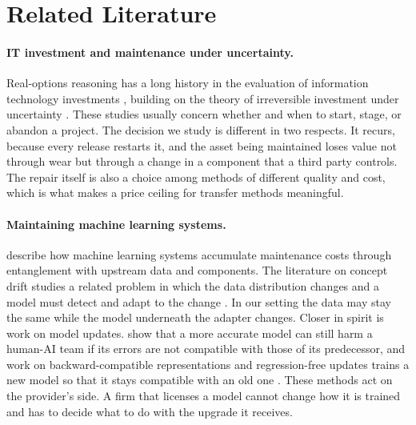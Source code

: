 \documentclass[ijds,blindrev]{informs4}
\begin{document}
\section{Related Literature}\label{sec:lit}

\paragraph{IT investment and maintenance under uncertainty.} Real-options reasoning has a long history in the evaluation of information technology investments \citep{benaroch1999case,benaroch2002managing}, building on the theory of irreversible investment under uncertainty \citep{mcdonald1986value,dixit1994investment}. These studies usually concern whether and when to start, stage, or abandon a project. The decision we study is different in two respects. It recurs, because every release restarts it, and the asset being maintained loses value not through wear but through a change in a component that a third party controls. The repair itself is also a choice among methods of different quality and cost, which is what makes a price ceiling for transfer methods meaningful.

\paragraph{Maintaining machine learning systems.} \citet{sculley2015hidden} describe how machine learning systems accumulate maintenance costs through entanglement with upstream data and components. The literature on concept drift studies a related problem in which the data distribution changes and a model must detect and adapt to the change \citep{gama2014survey}. In our setting the data may stay the same while the model underneath the adapter changes. Closer in spirit is work on model updates. \citet{bansal2019updates} show that a more accurate model can still harm a human-AI team if its errors are not compatible with those of its predecessor, and work on backward-compatible representations and regression-free updates trains a new model so that it stays compatible with an old one \citep{shen2020backward,yan2021positive}. These methods act on the provider's side. A firm that licenses a model cannot change how it is trained and has to decide what to do with the upgrade it receives.
\end{document}
